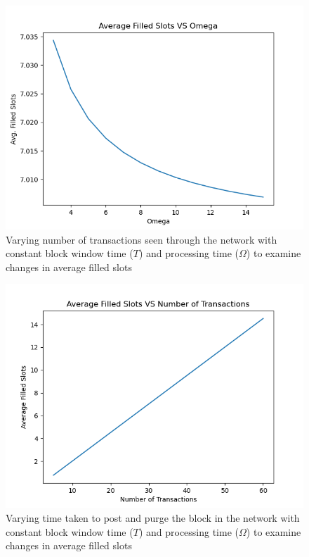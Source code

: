 \documentclass[conference]{IEEEtran}
\begin{document}
\begin{figure}[htbp]
    \centerline{\includegraphics[width=\linewidth]{Figures/AvgFilledSlotsVSOmegaConstTrnx.png}}
    \caption{Varying number of transactions seen through the network with constant block window time ($T$) and processing time ($\Omega$) to examine changes in average filled slots}
    \label{AFS_trans}
\end{figure}

\begin{figure}[htbp]
    \centerline{\includegraphics[width=\linewidth]{Figures/AvgFilledSlotsVSNoOfTrnxConstOmega.png}}
    \caption{Varying time taken to post and purge the block in the network with constant block window time ($T$) and processing time ($\Omega$) to examine changes in average filled slots}
    \label{AFS_omega}
\end{figure}
\end{document}
